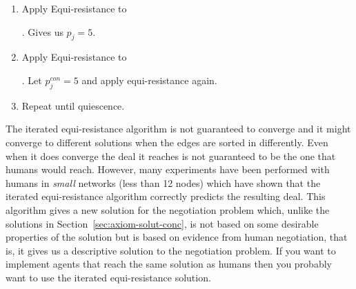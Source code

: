 \begin{enumerate}
\item Apply Equi-resistance to
  \begin{tiny}
  \end{tiny}. Gives us $p_j = 5$.
  
\item Apply Equi-resistance to
  \begin{tiny}
  \end{tiny}. Let $p_j^{con} = 5$ and apply
  equi-resistance again.
\item Repeat until quiescence.
\end{enumerate}

The iterated equi-resistance algorithm is not guaranteed to converge
and it might converge to different solutions when the edges are sorted
in differently. Even when it does converge the deal it reaches is not
guaranteed to be the one that humans would reach. However, many
experiments have been performed with humans in \emph{small} networks
(less than 12 nodes) which have shown that the iterated
equi-resistance algorithm correctly predicts the resulting deal. This
algorithm gives a new solution for the negotiation problem which,
unlike the solutions in Section~\ref{sec:axiom-solut-conc}, is not
based on some desirable properties of the solution but is based on
evidence from human negotiation, that is, it gives us a descriptive
solution to the negotiation problem. If you want to implement agents that
reach the same solution as humans then you probably want to use the
iterated equi-resistance solution.

